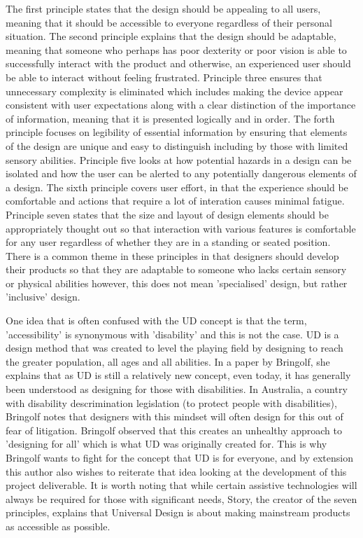 The first principle states that the design should be appealing to all users, meaning that it should be accessible to everyone regardless of their personal situation.
The second principle explains that the design should be adaptable, meaning that someone who perhaps has poor dexterity or poor vision is able to successfully interact with the product and otherwise, an experienced user should be able to interact without feeling frustrated. %
Principle three ensures that unnecessary complexity is eliminated which includes making the device appear consistent with user expectations along with a clear distinction of the importance of information, meaning that it is presented logically and in order.
The forth principle focuses on legibility of essential information by ensuring that elements of the design are unique and easy to distinguish including by those with limited sensory abilities.
Principle five looks at how potential hazards in a design can be isolated and how the user can be alerted to any potentially dangerous elements of a design.
The sixth principle covers user effort, in that the experience should be comfortable and actions that require a lot of interation causes minimal fatigue.
Principle seven states that the size and layout of design elements should be appropriately thought out so that interaction with various features is comfortable for any user regardless of whether they are in a standing or seated position.
There is a common theme in these principles in that designers should develop their products so that they are adaptable to someone who lacks certain sensory or physical abilities however, this does not mean 'specialised' design, but rather 'inclusive' design.

One idea that is often confused with the UD concept is that the term, 'accessibility' is synonymous with 'disability' and this is not the case.
UD is a design method that was created to level the playing field by designing to reach the greater population, all ages and all abilities.
In a paper by Bringolf\cite{accessible}, she explains that as UD is still a relatively new concept, even today, it has generally been understood as designing for those with disabilities.
In Australia, a country with disability descrimination legislation (to protect people with disabilities), Bringolf notes that designers with this mindset will often design for this out of fear of litigation.
Bringolf observed that this creates an unhealthy approach to 'designing for all' which is what UD was originally created for. %
This is why Bringolf wants to fight for the concept that UD is for everyone, and by extension this author also wishes to reiterate that idea looking at the development of this project deliverable. %
It is worth noting that while certain assistive technologies will always be required for those with significant needs, Story, the creator of the seven principles, explains that Universal Design is about making mainstream products as accessible as possible\cite{sevenprinciples}.

